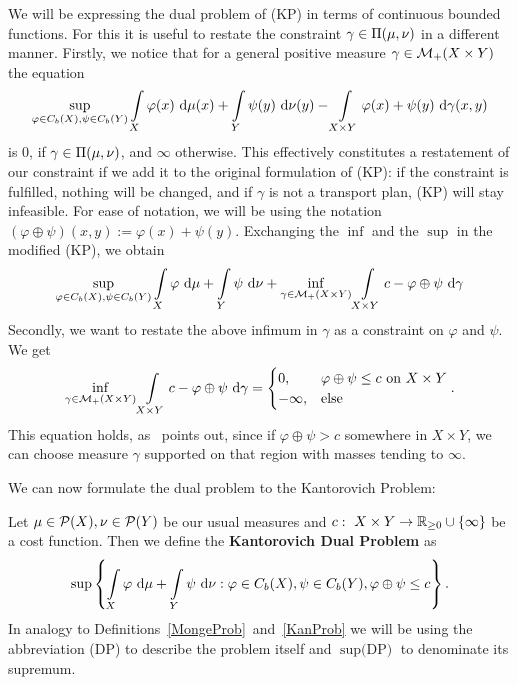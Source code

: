 We will be expressing the dual problem of (KP) in terms of continuous bounded functions. For this it is useful to restate the constraint $\gamma \in \TP{\mu}{\nu}$ in a different manner. Firstly, we notice that for a general positive measure $\gamma \in \M[+]{X \times Y}$ the equation
\[ \sup\limits_{\varphi \in \CF[b]{X}, \psi \in \CF[b]{Y}} \int\limits_X \varphi(x)~\Dx{\mu} + \int\limits_Y \psi(y)~\Dx[y]{\nu} - \int\limits_{X \times Y} \varphi(x) + \psi(y)~\Dx[x, y]{\gamma} \]
is $0$, if $\gamma \in \TP{\mu}{\nu}$, and $\infty$ otherwise. This effectively constitutes a restatement of our constraint if we add it to the original formulation of (KP): if the constraint is fulfilled, nothing will be changed, and if $\gamma$ is not a transport plan, (KP) will stay infeasible. For ease of notation, we will be using the notation $(\varphi \oplus \psi)(x, y) := \varphi(x) + \psi(y)$. Exchanging the $\inf$ and the $\sup$ in the modified (KP), we obtain
\[ \sup\limits_{\varphi \in \CF[b]{X}, \psi \in \CF[b]{Y}} \int\limits_{X} \varphi~\D + \int\limits_{Y} \psi~\D[\nu] + \inf\limits_{\gamma \in \M[+]{X \times Y}} \int\limits_{X \times Y} c - \varphi \oplus \psi~\D[\gamma] \]
Secondly, we want to restate the above infimum in $\gamma$ as a constraint on $\varphi$ and $\psi$. We get
\[ \inf\limits_{\gamma \in \M[+]{X \times Y}} \int\limits_{X \times Y} c - \varphi \oplus \psi~\D[\gamma] = 
\begin{cases}
	0, & \varphi \oplus \psi \le c \text{ on } X \times Y \\
	- \infty, & \text{else}
\end{cases}. \]
This equation holds, as~\cite{San2015} points out, since if $\varphi \oplus \psi > c$ somewhere in $X \times Y$, we can choose measure $\gamma$ supported on that region with masses tending to $\infty$. 

We can now formulate the dual problem to the Kantorovich Problem:

\begin{definition}\label{DualProb}
	Let $\mu \in \PM{X}, \nu \in \PM{Y}$ be our usual measures and $\map[c]{X \times Y}{\RZero{} \cup{} \{ \infty \}}$ be a cost function. Then we define the \textbf{Kantorovich Dual Problem} as
	\begin{equation}\label{DPEq}
		\sup \left\{ \int\limits_{X} \varphi~\D + \int\limits_{Y} \psi~\D[\nu] : \varphi \in \CF[b]{X}, \psi \in \CF[b]{Y}, \varphi \oplus \psi \le c \right\}.
	\end{equation}
	In analogy to Definitions~\ref{MongeProb}~and~\ref{KanProb} we will be using the abbreviation (DP) to describe the problem itself and $\sup \text{(DP)}$ to denominate its supremum.
\end{definition}

